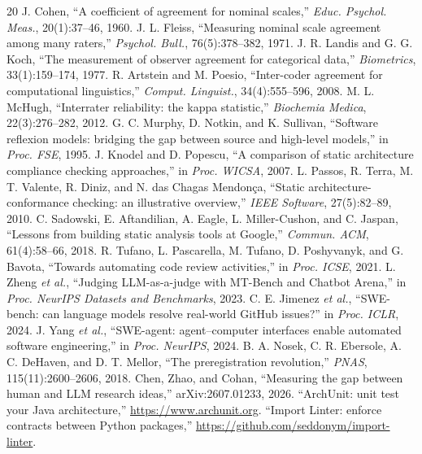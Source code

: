 \documentclass[conference]{IEEEtran}
\begin{document}
\balance

\begin{thebibliography}{20}
 J. Cohen, ``A coefficient of agreement for nominal
scales,'' \emph{Educ. Psychol. Meas.}, 20(1):37--46, 1960.
 J. L. Fleiss, ``Measuring nominal scale agreement among
many raters,'' \emph{Psychol. Bull.}, 76(5):378--382, 1971.
 J. R. Landis and G. G. Koch, ``The measurement of observer
agreement for categorical data,'' \emph{Biometrics}, 33(1):159--174, 1977.
 R. Artstein and M. Poesio, ``Inter-coder agreement
for computational linguistics,'' \emph{Comput. Linguist.}, 34(4):555--596,
2008.
 M. L. McHugh, ``Interrater reliability: the kappa
statistic,'' \emph{Biochemia Medica}, 22(3):276--282, 2012.
 G. C. Murphy, D. Notkin, and K. Sullivan,
``Software reflexion models: bridging the gap between source and high-level
models,'' in \emph{Proc. FSE}, 1995.
 J. Knodel and D. Popescu, ``A comparison of
static architecture compliance checking approaches,'' in \emph{Proc. WICSA},
2007.
 L. Passos, R. Terra, M. T. Valente, R. Diniz, and
N. das Chagas Mendon\c{c}a, ``Static architecture-conformance checking: an
illustrative overview,'' \emph{IEEE Software}, 27(5):82--89, 2010.
 C. Sadowski, E. Aftandilian, A. Eagle,
L. Miller-Cushon, and C. Jaspan, ``Lessons from building static analysis tools
at Google,'' \emph{Commun. ACM}, 61(4):58--66, 2018.
 R. Tufano, L. Pascarella, M. Tufano, D. Poshyvanyk,
and G. Bavota, ``Towards automating code review activities,'' in \emph{Proc.
ICSE}, 2021.
 L. Zheng \emph{et al.}, ``Judging LLM-as-a-judge
with MT-Bench and Chatbot Arena,'' in \emph{Proc. NeurIPS Datasets and
Benchmarks}, 2023.
 C. E. Jimenez \emph{et al.}, ``SWE-bench: can
language models resolve real-world GitHub issues?'' in \emph{Proc. ICLR},
2024.
 J. Yang \emph{et al.}, ``SWE-agent: agent--computer
interfaces enable automated software engineering,'' in \emph{Proc. NeurIPS},
2024.
 B. A. Nosek, C. R. Ebersole, A. C. DeHaven,
and D. T. Mellor, ``The preregistration revolution,'' \emph{PNAS},
115(11):2600--2606, 2018.
 Chen, Zhao, and Cohan, ``Measuring the gap between
human and LLM research ideas,'' arXiv:2607.01233, 2026.
 ``ArchUnit: unit test your Java architecture,''
\url{https://www.archunit.org}.
 ``Import Linter: enforce contracts between Python
packages,'' \url{https://github.com/seddonym/import-linter}.
\end{thebibliography}
\end{document}
